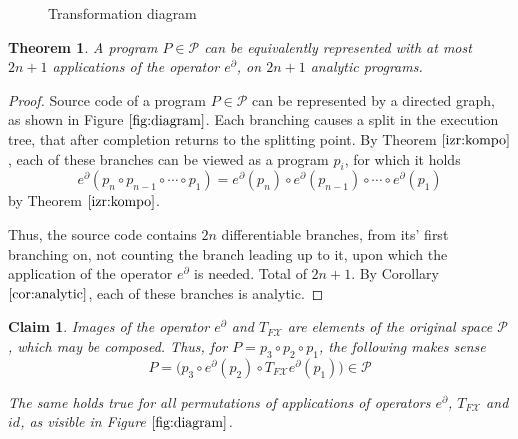 \documentclass[preprint,12pt]{elsarticle}
\newcommand{\X}{\mathcal{X}}
\newcommand{\dP}{\mathcal{P}}
\newcommand{\D}{\partial}
\newtheorem{trditev}{Claim}[section]
\newtheorem{izrek}{Theorem}[section]
\begin{document}
\begin{figure}[!h]
\vspace{3px}
\caption{Transformation diagram} \label{fig:diagram} 
\end{figure}

\begin{izrek}
A program $P\in\dP$ can be equivalently represented with at most $2n+1$ applications of the operator $e^\D$, on $2n+1$ analytic programs.
\end{izrek}

\begin{proof}
	Source code of a program $P\in\dP$ can be represented by a directed graph, as shown in Figure $\ref{fig:diagram}$. Each branching causes a split in the execution tree, that after completion returns to the splitting point.
	By Theorem $\ref{izr:kompo}$, each of these branches can be viewed as a program $p_i$, for which it holds $$e^\D(p_n\circ p_{n-1}\circ\cdots\circ p_1)=e^\D(p_n)\circ e^\D(p_{n-1})\circ\cdots\circ e^\D(p_1)$$ by Theorem $\ref{izr:kompo}$.
	
	Thus, the source code contains $2n$ differentiable branches, from its' first branching on, not counting the branch leading up to it, upon which the application of the operator $e^\D$ is needed. Total of $2n+1$. By Corollary $\ref{cor:analytic}$, each of these branches is analytic.
\end{proof}

\begin{trditev}\label{trd:composeOperators}
Images of the operator $e^\D$ and $T_{F\X}$  are elements of the original space $\dP$, which may be composed. Thus, for $P=p_3\circ p_2\circ p_1$, the following makes sense
\begin{equation}
P=\Big(p_3\circ e^ \D(p_2)\circ T_{F\X}e^\D(p_1)\Big) \in \dP
\end{equation}

The same holds true for all permutations of applications of operators $e^\D$, $T_{F\X}$ and $id$, as visible in Figure $\ref{fig:diagram}$.
\end{trditev}
\end{document}
